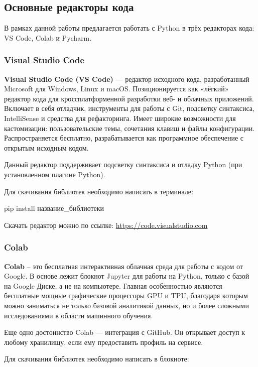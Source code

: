 \subsection{Основные редакторы кода}

В рамках данной работы предлагается работать с Python в трёх редакторах кода: VS Code, Colab и Pycharm.

\subsubsection{Visual Studio Code}

\textbf{Visual Studio Code (VS Code)} — редактор исходного кода, разработанный Microsoft для Windows, Linux и macOS. Позиционируется как «лёгкий» редактор кода для кроссплатформенной разработки веб- и облачных приложений. Включает в себя отладчик, инструменты для работы с Git, подсветку синтаксиса, IntelliSense и средства для рефакторинга. Имеет широкие возможности для кастомизации: пользовательские темы, сочетания клавиш и файлы конфигурации. Распространяется бесплатно, разрабатывается как программное обеспечение с открытым исходным кодом.

Данный редактор поддерживает подсветку синтаксиса и отладку Python (при установленном плагине Python).

Для скачивания библиотек необходимо написать в терминале:

\begin{center}
	pip install название\_библиотеки
\end{center}

Скачать редактор можно по ссылке: \url{https://code.visualstudio.com}

\subsubsection{Colab}

\textbf{Colab} -- это бесплатная интерактивная облачная среда для работы с кодом от Google. В основе лежит блокнот Jupyter для работы на Python, только с базой на Google Диске, а не на компьютере. Главная особенностью являются бесплатные мощные графические процессоры GPU и TPU, благодаря которым можно заниматься не только базовой аналитикой данных, но и более сложными исследованиями в области машинного обучения.

Еще одно достоинство Colab — интеграция с GitHub. Он открывает доступ к любому хранилищу, если ему предоставить профиль на сервисе.

Для скачивания библиотек необходимо написать в блокноте:

